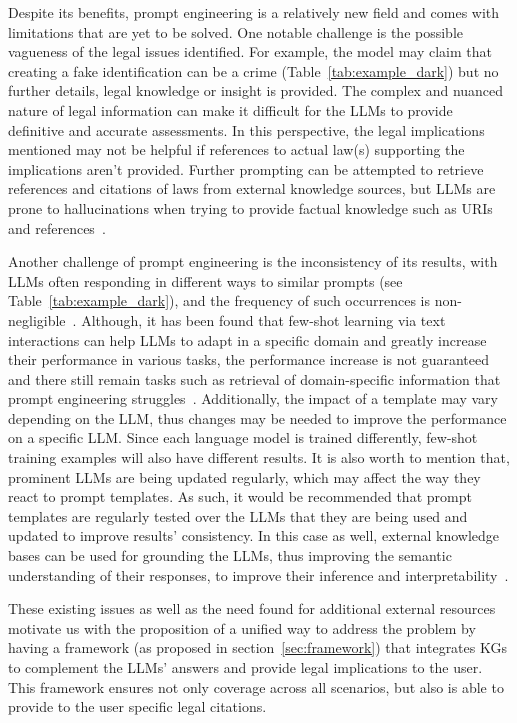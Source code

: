 \documentclass[sn-mathphys-num]{sn-jnl}%
\begin{document}
Despite its benefits, prompt engineering is a relatively new field and comes with limitations that are yet to be solved.
One notable challenge is the possible vagueness of the legal issues identified. 
For example, the model may claim that creating a fake identification can be a crime (Table~\ref{tab:example_dark}) but no further details, legal knowledge or insight is provided.
The complex and nuanced nature of legal information can make it difficult for the LLMs to provide definitive and accurate assessments. In this perspective, the legal implications mentioned may not be helpful if  references to actual law(s) supporting the implications aren't provided.
Further prompting can be attempted to retrieve references and citations of laws from external knowledge sources, but LLMs are prone to hallucinations when trying to provide factual knowledge such as URIs and references~\cite{ji2023survey,gao2023enabling,damato2023machine}.   


Another challenge of prompt engineering is the inconsistency of its results, with LLMs often responding in different ways to similar prompts (see Table~\ref{tab:example_dark}), and the frequency of such occurrences is non-negligible~\cite{jang2023consistency}.
Although, it has been found that few-shot learning via text interactions can help LLMs to adapt in a specific domain and greatly increase their performance in various tasks, the performance increase is not guaranteed and there still remain tasks such as retrieval of domain-specific information that prompt engineering struggles~\cite{brown2020language}.
Additionally, the impact of a template may vary depending on the LLM, thus changes may be needed to improve the performance on a specific LLM. 
Since each language model is trained differently, few-shot training examples will also have different results. 
It is also worth to mention that, prominent LLMs are being updated regularly, which may affect the way they react to prompt templates. As such, it would be recommended that prompt templates are regularly tested over the LLMs that they are being used and updated to improve results' consistency.
In this case as well, external knowledge bases can be used for grounding the LLMs, thus improving the semantic understanding of their responses, to improve their inference and interpretability~\cite{pan2023UnifyingLL}.

These existing issues as well as the need found for additional external resources motivate us with the proposition of a unified way to address the problem by having a framework (as proposed in section~\ref{sec:framework}) that integrates KGs to complement the LLMs' answers and provide legal implications to the user. This framework ensures not only coverage across all scenarios, but also is able to provide to the user specific legal citations.
\end{document}
